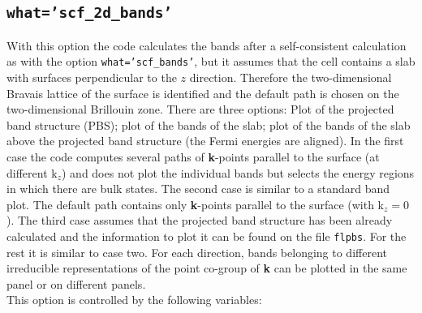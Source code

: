 \documentclass[12pt,a4paper]{article}
\begin{document}
\subsection{\color{web-blue}\texttt{what='scf\_2d\_bands'}}
With this option the code calculates the bands after a self-consistent 
calculation as with the option \texttt{what='scf\_bands'}, but it assumes 
that the cell contains a slab with surfaces perpendicular to the $z$ 
direction. Therefore the two-dimensional Bravais lattice of the surface 
is identified and the default path is chosen on the two-dimensional 
Brillouin zone. 
There are three options: Plot of the projected band structure (PBS); 
plot of the bands of the slab; plot of the bands of the slab above the
projected band structure (the Fermi energies are aligned). In the first 
case the code computes several paths
of {\bf k}-points parallel to the surface (at different k$_z$) and does 
not plot the individual bands but selects the energy regions in which 
there are bulk states. The second case is similar to a standard band plot. 
The default path contains only {\bf k}-points parallel to the 
surface (with k$_z=0$). The third case assumes that the projected band 
structure has been already calculated and the information to plot it 
can be found on the file \texttt{flpbs}. For the rest it is 
similar to case two. For each direction, bands belonging to different 
irreducible representations of the point co-group of {\bf k} can be plotted 
in the same panel or on different panels.\\
This option is controlled by the following variables:
\end{document}
